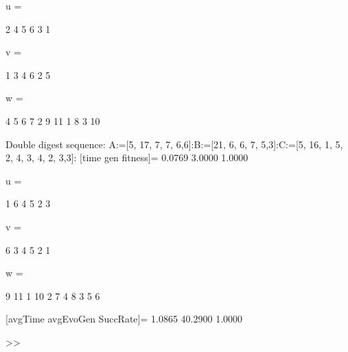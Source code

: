 u =

     2     4     5     6     3     1


v =

     1     3     4     6     2     5


w =

     4     5     6     7     2     9    11     1     8     3    10

Double digest sequence:
A:=[5, 17, 7, 7, 6,6]:B:=[21, 6, 6, 7, 5,3]:C:=[5, 16, 1, 5, 2, 4, 3, 4, 2, 3,3]:
[time gen fitness]=
    0.0769    3.0000    1.0000


u =

     1     6     4     5     2     3


v =

     6     3     4     5     2     1


w =

     9    11     1    10     2     7     4     8     3     5     6

[avgTime  avgEvoGen  SuccRate]=
    1.0865   40.2900    1.0000

>> 
